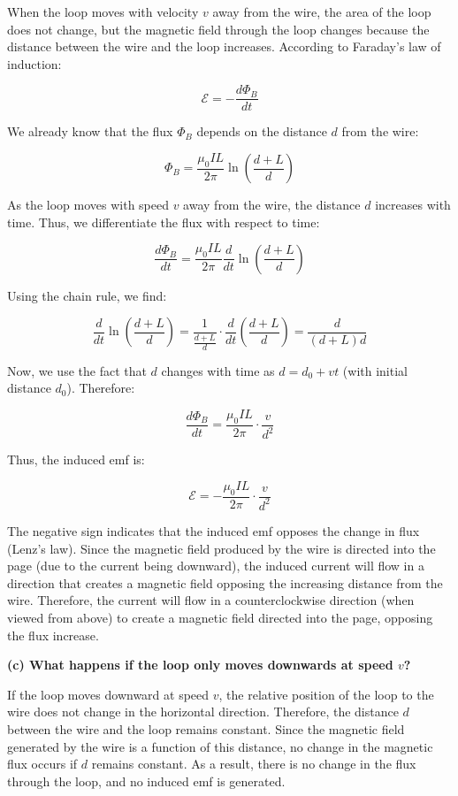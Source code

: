 When the loop moves with velocity $v$ away from the wire, the area of the loop does not change, but the magnetic field through the loop changes because the distance between the wire and the loop increases. According to Faraday’s law of induction:

\[
\mathcal{E} = - \frac{d\Phi_B}{dt}
\]

We already know that the flux $\Phi_B$ depends on the distance $d$ from the wire:

\[
\Phi_B = \frac{\mu_0 I L}{2 \pi} \ln\left( \frac{d + L}{d} \right)
\]

As the loop moves with speed $v$ away from the wire, the distance $d$ increases with time. Thus, we differentiate the flux with respect to time:

\[
\frac{d\Phi_B}{dt} = \frac{\mu_0 I L}{2 \pi} \frac{d}{dt} \ln\left( \frac{d + L}{d} \right)
\]

Using the chain rule, we find:

\[
\frac{d}{dt} \ln\left( \frac{d + L}{d} \right) = \frac{1}{\frac{d + L}{d}} \cdot \frac{d}{dt} \left( \frac{d + L}{d} \right) = \frac{d}{(d + L)d}
\]

Now, we use the fact that $d$ changes with time as $d = d_0 + vt$ (with initial distance $d_0$). Therefore:

\[
\frac{d\Phi_B}{dt} = \frac{\mu_0 I L}{2 \pi} \cdot \frac{v}{d^2}
\]

Thus, the induced emf is:

\[
\mathcal{E} = - \frac{\mu_0 I L}{2 \pi} \cdot \frac{v}{d^2}
\]

The negative sign indicates that the induced emf opposes the change in flux (Lenz’s law). Since the magnetic field produced by the wire is directed into the page (due to the current being downward), the induced current will flow in a direction that creates a magnetic field opposing the increasing distance from the wire. Therefore, the current will flow in a counterclockwise direction (when viewed from above) to create a magnetic field directed into the page, opposing the flux increase.

\textbf{(c) What happens if the loop only moves downwards at speed $v$?}

If the loop moves downward at speed $v$, the relative position of the loop to the wire does not change in the horizontal direction. Therefore, the distance $d$ between the wire and the loop remains constant. Since the magnetic field generated by the wire is a function of this distance, no change in the magnetic flux occurs if $d$ remains constant. As a result, there is no change in the flux through the loop, and no induced emf is generated. 

